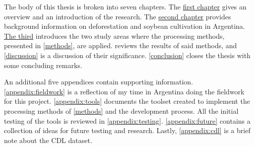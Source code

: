 The body of this thesis is broken into seven chapters. The \hyperref[intro]{first chapter} gives an overview and an introduction of the research. The \hyperref[background]{second chapter} provides background information on deforestation and soybean cultivation in Argentina. \hyperref[studyareas]{The third} introduces the two study areas where the processing methods, presented in \cref{methods}, are applied.  reviews the results of said methods, and \cref{discussion} is a discussion of their significance. \cref{conclusion} closes the thesis with some concluding remarks.

An additional five appendices contain supporting information. \autoref{appendix:fieldwork} is a reflection of my time in Argentina doing the fieldwork for this project. \autoref{appendix:tools} documents the toolset created to implement the processing methods of \cref{methods} and the development process. All the initial testing of the tools is reviewed in \autoref{appendix:testing}. \autoref{appendix:future} contains a collection of ideas for future testing and research. Lastly, \autoref{appendix:cdl} is a brief note about the CDL dataset.